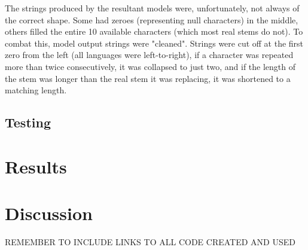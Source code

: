 \documentclass{article}
\begin{document}
      The strings produced by the resultant models were, unfortunately, not always of the correct shape. Some had zeroes (representing null characters) in the middle, others filled the entire 10 available characters (which most real stems do not). To combat this, model output strings were "cleaned". Strings were cut off at the first zero from the left (all languages were left-to-right), if a character was repeated more than twice consecutively, it was collapsed to just two, and if the length of the stem was longer than the real stem it was replacing, it was shortened to a matching length. 

    \subsection{Testing}

  \section{Results}
  \section{Discussion}

  REMEMBER TO INCLUDE LINKS TO ALL CODE CREATED AND USED
  
\end{document}
